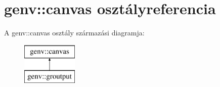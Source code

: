 \hypertarget{classgenv_1_1canvas}{}\section{genv\+:\+:canvas osztályreferencia}
\label{classgenv_1_1canvas}
A genv\+:\+:canvas osztály származási diagramja\+:\begin{figure}[H]
\begin{center}
\leavevmode
\includegraphics[height=2.000000cm]{classgenv_1_1canvas}
\end{center}
\end{figure}
